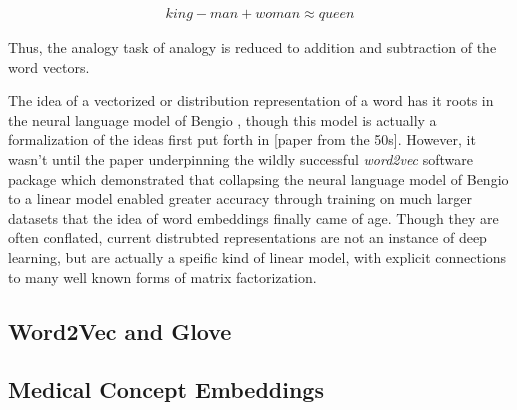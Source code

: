 \documentclass{ws-procs11x85}
\begin{document}
\begin{align}
king - man + woman \approx queen
\end{align}

Thus, the analogy task of analogy is reduced to addition and subtraction of the word vectors.

The idea of a vectorized or distribution representation of a word has it roots in the neural language model of Bengio \cite{bengio2003neural}, though this model is actually a formalization of the ideas first put forth in [paper from the 50s]. However, it wasn't until the paper\cite{mikolov2013distributed} underpinning the wildly successful \emph{word2vec} software package which demonstrated that collapsing the neural language model of Bengio\cite{bengio2003neural} to a linear model enabled greater accuracy through training on much larger datasets that the idea of word embeddings finally came of age. Though they are often conflated, current distrubted representations are not an instance of deep learning, but are actually a speific kind of linear model, with explicit connections to many well known forms of matrix factorization\cite{levy2014neural}.

 \subsection{Word2Vec and Glove}

 \subsection{Medical Concept Embeddings}
\end{document}
